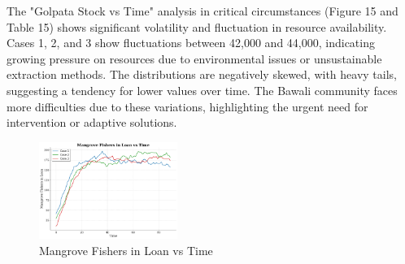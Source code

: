 \documentclass[final,5p,times,twocolumn,authoryear]{elsarticle}
\begin{document}
The "Golpata Stock vs Time" analysis in critical circumstances (Figure 15 and Table 15) shows significant volatility and fluctuation in resource availability. Cases 1, 2, and 3 show fluctuations between 42,000 and 44,000, indicating growing pressure on resources due to environmental issues or unsustainable extraction methods. The distributions are negatively skewed, with heavy tails, suggesting a tendency for lower values over time. The Bawali community faces more difficulties due to these variations, highlighting the urgent need for intervention or adaptive solutions.
\begin{figure}[htbp]
    \centering
    \includegraphics[width=0.4\textwidth]{graph_all/plots_crit/mangrove_fishers_in_loan_vs_time.png}
    \caption{Mangrove Fishers in Loan vs Time}
    \label{fig:mangrove_loan}
\end{figure}
\begin{table}[htbp]
    \centering
    \caption{Mangrove Fishers in Loan - Statistical Analysis}
\end{table}
\end{document}
